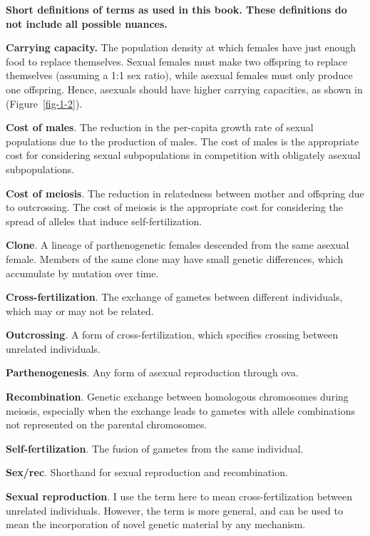 \documentclass[
  letterpaper,
]{book}
\begin{document}
\begin{tcolorbox}[enhanced jigsaw, colback=white, coltitle=black, arc=.35mm, colframe=quarto-callout-tip-color-frame, breakable, bottomrule=.15mm, bottomtitle=1mm, toprule=.15mm, toptitle=1mm, left=2mm, opacitybacktitle=0.6, rightrule=.15mm, titlerule=0mm, title=\textcolor{quarto-callout-tip-color}{\faLightbulb}\hspace{0.5em}{Box 1.1}, leftrule=.75mm, opacityback=0, colbacktitle=quarto-callout-tip-color!10!white]

\textbf{Short definitions of terms as used in this book. These
definitions do not include all possible nuances.}

\textbf{Carrying capacity.} The population density at which females have
just enough food to replace themselves. Sexual females must make two
offspring to replace themselves (assuming a 1:1 sex ratio), while
asexual females must only produce one offspring. Hence, asexuals should
have higher carrying capacities, as shown in (Figure~\ref{fig-1-2}).

\textbf{Cost of males}. The reduction in the per-capita growth rate of
sexual populations due to the production of males. The cost of males is
the appropriate cost for considering sexual subpopulations in
competition with obligately asexual subpopulations.

\textbf{Cost of meiosis}. The reduction in relatedness between mother
and offspring due to outcrossing. The cost of meiosis is the appropriate
cost for considering the spread of alleles that induce
self-fertilization.

\textbf{Clone}. A lineage of parthenogenetic females descended from the
same asexual female. Members of the same clone may have small genetic
differences, which accumulate by mutation over time.

\textbf{Cross-fertilization}. The exchange of gametes between different
individuals, which may or may not be related.

\textbf{Outcrossing}. A form of cross-fertilization, which specifies
crossing between unrelated individuals.

\textbf{Parthenogenesis}. Any form of asexual reproduction through ova.

\textbf{Recombination}. Genetic exchange between homologous chromosomes
during meiosis, especially when the exchange leads to gametes with
allele combinations not represented on the parental chromosomes.

\textbf{Self-fertilization}. The fusion of gametes from the same
individual.

\textbf{Sex/rec}. Shorthand for sexual reproduction and recombination.

\textbf{Sexual reproduction}. I use the term here to mean
cross-fertilization between unrelated individuals. However, the term is
more general, and can be used to mean the incorporation of novel genetic
material by any mechanism.

\end{tcolorbox}
\end{document}
